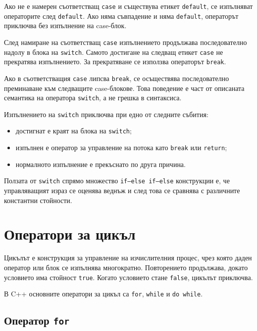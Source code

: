 Ако не е намерен съответстващ \texttt{case} и съществува етикет \texttt{default}, се изпълняват операторите след \texttt{default}. Ако няма съвпадение и няма \texttt{default}, операторът приключва без изпълнение на case-блок.

След намиране на съответстващ \texttt{case} изпълнението продължава последователно надолу в блока на \texttt{switch}. Самото достигане на следващ етикет \texttt{case} не прекратява изпълнението. За прекратяване се използва операторът \texttt{break}.

\begin{supp}[Бележка]
Ако в съответстващия \texttt{case} липсва \texttt{break}, се осъществява последователно преминаване към следващите case-блокове. Това поведение е част от описаната семантика на оператора \texttt{switch}, а не грешка в синтаксиса.
\end{supp}

Изпълнението на \texttt{switch} приключва при едно от следните събития:

\begin{itemize}
\item достигнат е краят на блока на \texttt{switch};
\item изпълнен е оператор за управление на потока като \texttt{break} или \texttt{return};
\item нормалното изпълнение е прекъснато по друга причина.
\end{itemize}

Ползата от \texttt{switch} спрямо множество \texttt{if--else if--else} конструкции е, че управляващият израз се оценява веднъж и след това се сравнява с различните константни стойности.

\section{Оператори за цикъл}\label{s:14.4}

Цикълът е конструкция за управление на изчислителния процес, чрез която даден оператор или блок се изпълнява многократно. Повторението продължава, докато условието има стойност \texttt{true}. Когато условието стане \texttt{false}, цикълът приключва.

В C++ основните оператори за цикъл са \texttt{for}, \texttt{while} и \texttt{do while}.

\subsection{Оператор \texttt{for}}\label{s:14.4.1}

